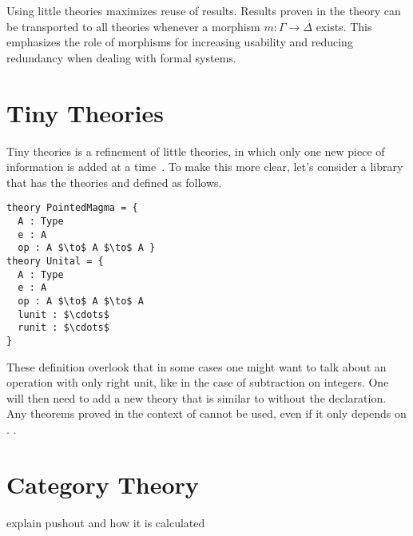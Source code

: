 Using little theories maximizes reuse of results. Results proven in the theory \lstmath{$\Gamma$} can be transported to all theories \lstmath{$\Delta$} whenever a morphism $m : \Gamma \to \Delta$ exists. This emphasizes the role of morphisms for increasing usability and reducing redundancy when dealing with formal systems.  

\section{Tiny Theories}
Tiny theories is a refinement of little theories, in which only one new piece of information is added at a time~\cite{mathscheme2011experiments}. To make this more clear, let's consider a library that has the theories  and  defined as follows. 
\begin{lstlisting}[mathescape]
theory PointedMagma = { 
  A : Type 
  e : A 
  op : A $\to$ A $\to$ A }
theory Unital = {
  A : Type 
  e : A 
  op : A $\to$ A $\to$ A 
  lunit : $\cdots$
  runit : $\cdots$
}   
\end{lstlisting}
These definition overlook that in some cases one might want to talk about an operation with only right unit, like in the case of subtraction on integers. One will then need to add a new theory that is similar to  without the  declaration. Any theorems proved in the context of  cannot be used, even if it only depends on . .  

\section{Category Theory}
explain pushout and how it is calculated 

